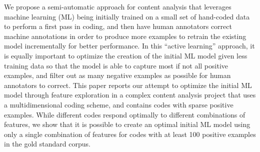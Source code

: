 We propose a semi-automatic approach for content analysis that leverages machine learning (ML) being initially trained on a small set of hand-coded data to perform a first pass in coding, and then have human annotators correct machine annotations in order to produce more examples to retrain the existing model incrementally for better performance. In this ``active learning'' approach, it is equally important to optimize the creation of the initial ML model given less training data so that the model is able to capture most if not all positive examples, and filter out as many negative examples as possible for human annotators to correct. This paper reports our attempt to optimize the initial ML model through feature exploration in a complex content analysis project that uses a multidimensional coding scheme, and contains codes with sparse positive examples. While different codes respond optimally to different combinations of features, we show that it is possible to create an optimal initial ML model using only a single combination of features for codes with at least 100 positive examples in the gold standard corpus.
